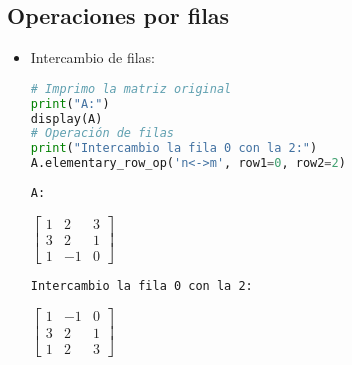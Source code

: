 \documentclass[a4,11pt]{aleph-notas}
\begin{document}
\subsection{Operaciones por filas}

\begin{itemize}
\item
    Intercambio de filas:
\begin{pycodigo}
    \begin{ipynbcodigo}\begin{lstlisting}[language=Python]
# Imprimo la matriz original
print("A:")
display(A)
# Operación de filas
print("Intercambio la fila 0 con la 2:")
A.elementary_row_op('n<->m', row1=0, row2=2)
    \end{lstlisting}\end{ipynbcodigo}
    \begin{ipynbsalida}
    \begin{Verbatim}
A:
    \end{Verbatim}
    $\displaystyle \left[\begin{matrix}1 & 2 & 3\\3 & 2 & 1\\1 & -1 & 0\end{matrix}\right]$
    \begin{Verbatim}
Intercambio la fila 0 con la 2:
    \end{Verbatim}
    $\displaystyle \left[\begin{matrix}1 & -1 & 0\\3 & 2 & 1\\1 & 2 & 3\end{matrix}\right]$
    \end{ipynbsalida}
\end{pycodigo}


\end{itemize}
\end{document}
